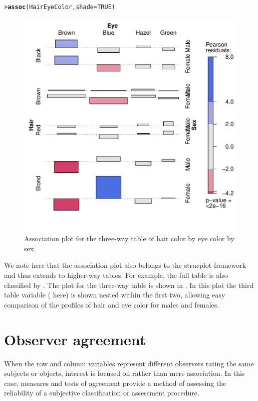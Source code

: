 \documentclass[10pt,krantz2]{krantz}\usepackage[]{graphicx}\usepackage[]{color}
\makeatletter
\newcommand{\hlnum}[1]{\textcolor[rgb]{0.686,0.059,0.569}{#1}}%
\newcommand{\hlstd}[1]{\textcolor[rgb]{0.345,0.345,0.345}{#1}}%
\newcommand{\hlkwc}[1]{\textcolor[rgb]{0.333,0.667,0.333}{#1}}%
\newcommand{\hlkwd}[1]{\textcolor[rgb]{0.737,0.353,0.396}{\textbf{#1}}}%
\newenvironment{kframe}{%
 \def\at@end@of@kframe{}%
 \ifinner\ifhmode%
  \def\at@end@of@kframe{\end{minipage}}%
  \begin{minipage}{\columnwidth}%
 \fi\fi%
 \def\FrameCommand##1{\hskip\@totalleftmargin \hskip-\fboxsep
 \colorbox{shadecolor}{##1}\hskip-\fboxsep
     \hskip-\linewidth \hskip-\@totalleftmargin \hskip\columnwidth}%
 \MakeFramed {\advance\hsize-\width
   \@totalleftmargin\z@ \linewidth\hsize
   \@setminipage}}%
 {\par\unskip\endMakeFramed%
 \at@end@of@kframe}
\newenvironment{knitrout}{}{} %
\renewenvironment{knitrout}{\small\renewcommand{\baselinestretch}{.85}}{} %
\makeatother
\begin{document}
\begin{knitrout}
\color{fgcolor}\begin{kframe}
\begin{alltt}
\hlstd{> }\hlkwd{assoc}\hlstd{(HairEyeColor,} \hlkwc{shade}\hlstd{=}\hlnum{TRUE}\hlstd{)}
\end{alltt}
\end{kframe}\begin{figure}[!htbp]

\centerline{\includegraphics[width=.6\textwidth]{ch04/fig/HE-assoc2-1} }

\caption[Association plot for the three-way table of hair color by eye color by sex]{Association plot for the three-way table of hair color by eye color by sex.\label{fig:HE-assoc2}}
\end{figure}


\end{knitrout}
We note here that the association plot also belongs to the
strucplot framework and thus extends to higher-way tables.
For example, the full  table is
also classified by .
The plot for the three-way table
is shown in .
In this plot the third table
variable ( here) is shown nested within the first two,
allowing easy comparison of the profiles of hair and eye color
for males and females.


\section{Observer agreement}\label{sec:twoway-agree}

When the row and column variables represent different
observers rating the same subjects or objects, interest is focused on
 rather than mere association.
In this case, measures and tests
of agreement provide a method of assessing the
reliability of a subjective classification or assessment procedure.
\end{document}
